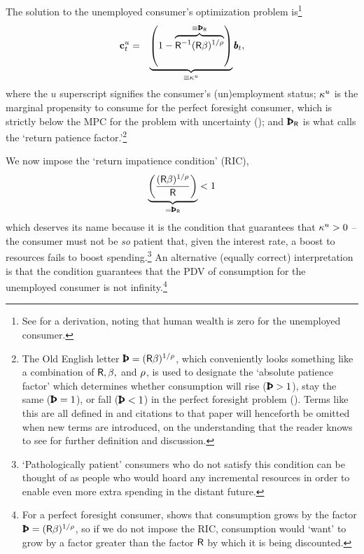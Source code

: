 \message{ !name(TractableBufferStock.tex)}\documentclass{handout}
\begin{document}
The solution to the unemployed consumer's optimization problem
is\footnote{See  for a derivation, noting that human wealth is zero for the unemployed consumer.} 
\begin{eqnarray}
        \cLevBF^{u}_{t} & = & \underbrace{\left(1-\overbrace{\Rfree ^{-1}(\Rfree{\Discount})^{1/\CRRA}}^{\equiv \PatR}\right)}_{\equiv \MPCU} \bLev_{t} \label{eq:cpfinfhorunemp} \label{eq:cdel} \label{eq:kappaDef} \label{eq:PatR}
,
\end{eqnarray}
where the $u$ superscript signifies the consumer's (un)employment
status; $\kappa^{u}$ is the marginal propensity to consume for the perfect
foresight consumer, which is strictly below the MPC for the problem
with uncertainty (\cite{carroll&kimball:concavity}); and $\PatR$ is
what \cite{carrollBSTheory} calls the `return patience factor.'\footnote{The Old English letter $\Pat = (\Rfree \Discount)^{1/\CRRA}$, which conveniently looks something like a combination of $\mathsf{R}, \beta, $ and $\rho$, is used to designate the `absolute patience factor' which determines whether consumption will rise ($\Pat > 1$), stay the same ($\Pat = 1$), or fall ($\Pat < 1$) in the perfect foresight problem ().  Terms like this are all defined in \cite{carrollBSTheory} and citations to that paper will henceforth be omitted when new terms are introduced, on the understanding that the reader knows to see \cite{carrollBSTheory} for further definition and discussion.}


\indent We now impose the `return impatience condition' (RIC),
\begin{eqnarray}
  \underbrace{\left(\frac{(\Rfree \Discount)^{1/\CRRA}}{\Rfree}\right)}_{= \PatR} < 1 \label{eq:RIC}
\end{eqnarray}
which deserves its name because it is the condition that guarantees that $\kappa^{u}
> 0$ -- the consumer must not be {\it so} patient that, given the interest rate, a boost to
resources fails to boost spending.\footnote{`Pathologically patient' consumers who do not satisfy this condition can be thought of as people who would hoard any incremental resources in order to enable even more extra spending in the distant future.}
An alternative (equally correct)
interpretation is that the condition guarantees that the PDV of
consumption for the unemployed consumer is not infinity.\footnote{For a perfect
foresight consumer,  shows that consumption grows by the factor
$\Pat = (\Rfree\Discount)^{1/\CRRA}$, so if we do not impose the RIC, consumption would `want' to grow by
a factor greater than the factor $\mathsf{R}$ by which it is being
discounted.}
\end{document}
